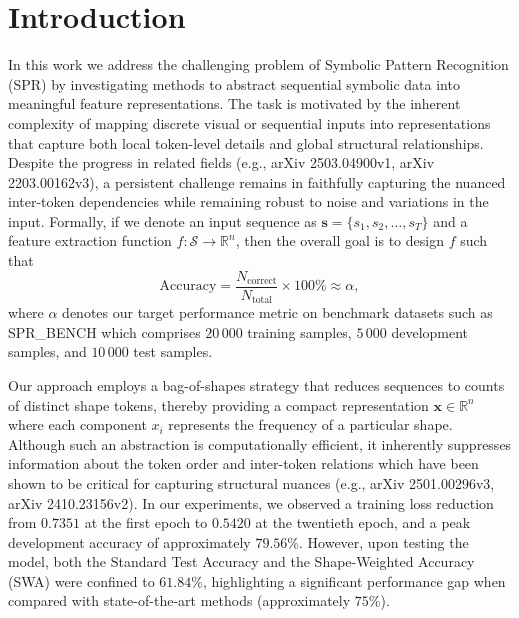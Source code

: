 \documentclass{article}
\begin{document}
\section{Introduction}
In this work we address the challenging problem of Symbolic Pattern Recognition (SPR) by investigating methods to abstract sequential symbolic data into meaningful feature representations. The task is motivated by the inherent complexity of mapping discrete visual or sequential inputs into representations that capture both local token-level details and global structural relationships. Despite the progress in related fields (e.g., arXiv 2503.04900v1, arXiv 2203.00162v3), a persistent challenge remains in faithfully capturing the nuanced inter-token dependencies while remaining robust to noise and variations in the input. Formally, if we denote an input sequence as $\boldsymbol{s} = \{s_1, s_2, \dots, s_T\}$ and a feature extraction function $f: \mathcal{S} \to \mathbb{R}^{n}$, then the overall goal is to design $f$ such that 
\[
\text{Accuracy} = \frac{N_{\text{correct}}}{N_{\text{total}}}\times 100\% \approx \alpha,
\]
where $\alpha$ denotes our target performance metric on benchmark datasets such as SPR\_BENCH which comprises $20\,000$ training samples, $5\,000$ development samples, and $10\,000$ test samples.

Our approach employs a bag-of-shapes strategy that reduces sequences to counts of distinct shape tokens, thereby providing a compact representation $\boldsymbol{x} \in \mathbb{R}^{n}$ where each component $x_i$ represents the frequency of a particular shape. Although such an abstraction is computationally efficient, it inherently suppresses information about the token order and inter-token relations which have been shown to be critical for capturing structural nuances (e.g., arXiv 2501.00296v3, arXiv 2410.23156v2). In our experiments, we observed a training loss reduction from $0.7351$ at the first epoch to $0.5420$ at the twentieth epoch, and a peak development accuracy of approximately $79.56\%$. However, upon testing the model, both the Standard Test Accuracy and the Shape-Weighted Accuracy (SWA) were confined to $61.84\%$, highlighting a significant performance gap when compared with state-of-the-art methods (approximately $75\%$).
\end{document}

